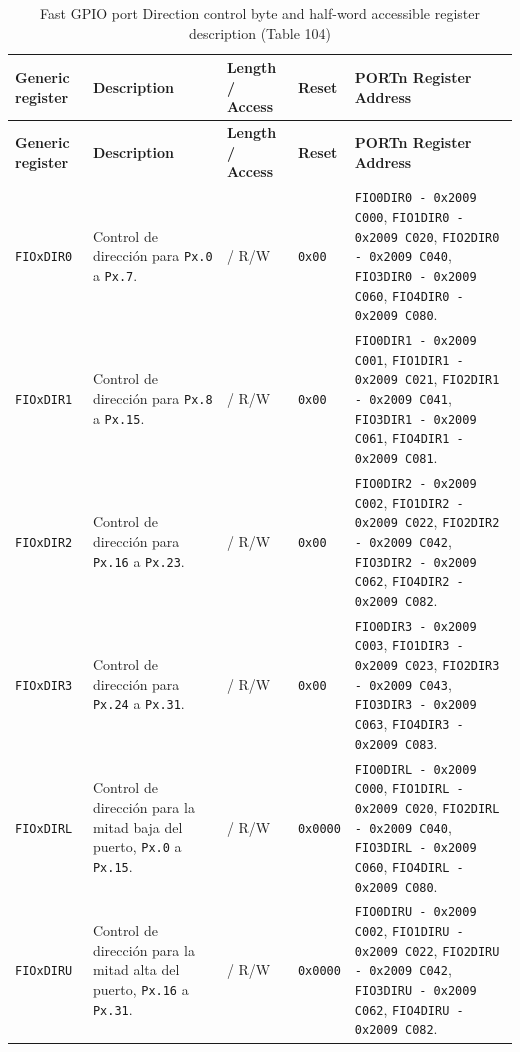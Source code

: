 \begin{longtable}{|>{\raggedright\arraybackslash}p{}|>{\raggedright\arraybackslash}p{}|>{\centering\arraybackslash}p{}|>{\centering\arraybackslash}p{}|>{\raggedright\arraybackslash}p{}|}
\caption{Fast GPIO port Direction control byte and half-word accessible register description (Table 104)} \\
\hline
\textbf{Generic register} & \textbf{Description} & \textbf{Length / Access} & \textbf{Reset} & \textbf{PORTn Register Address} \\
\hline
\endfirsthead
\hline
\textbf{Generic register} & \textbf{Description} & \textbf{Length / Access} & \textbf{Reset} & \textbf{PORTn Register Address} \\
\hline
\endhead
\texttt{FIOxDIR0} & Control de dirección para \texttt{Px.0} a \texttt{Px.7}. & 8 / R/W & \texttt{0x00} & \texttt{FIO0DIR0 - 0x2009 C000}, \texttt{FIO1DIR0 - 0x2009 C020}, \texttt{FIO2DIR0 - 0x2009 C040}, \texttt{FIO3DIR0 - 0x2009 C060}, \texttt{FIO4DIR0 - 0x2009 C080}. \\
\hline
\texttt{FIOxDIR1} & Control de dirección para \texttt{Px.8} a \texttt{Px.15}. & 8 / R/W & \texttt{0x00} & \texttt{FIO0DIR1 - 0x2009 C001}, \texttt{FIO1DIR1 - 0x2009 C021}, \texttt{FIO2DIR1 - 0x2009 C041}, \texttt{FIO3DIR1 - 0x2009 C061}, \texttt{FIO4DIR1 - 0x2009 C081}. \\
\hline
\texttt{FIOxDIR2} & Control de dirección para \texttt{Px.16} a \texttt{Px.23}. & 8 / R/W & \texttt{0x00} & \texttt{FIO0DIR2 - 0x2009 C002}, \texttt{FIO1DIR2 - 0x2009 C022}, \texttt{FIO2DIR2 - 0x2009 C042}, \texttt{FIO3DIR2 - 0x2009 C062}, \texttt{FIO4DIR2 - 0x2009 C082}. \\
\hline
\texttt{FIOxDIR3} & Control de dirección para \texttt{Px.24} a \texttt{Px.31}. & 8 / R/W & \texttt{0x00} & \texttt{FIO0DIR3 - 0x2009 C003}, \texttt{FIO1DIR3 - 0x2009 C023}, \texttt{FIO2DIR3 - 0x2009 C043}, \texttt{FIO3DIR3 - 0x2009 C063}, \texttt{FIO4DIR3 - 0x2009 C083}. \\
\hline
\texttt{FIOxDIRL} & Control de dirección para la mitad baja del puerto, \texttt{Px.0} a \texttt{Px.15}. & 16 / R/W & \texttt{0x0000} & \texttt{FIO0DIRL - 0x2009 C000}, \texttt{FIO1DIRL - 0x2009 C020}, \texttt{FIO2DIRL - 0x2009 C040}, \texttt{FIO3DIRL - 0x2009 C060}, \texttt{FIO4DIRL - 0x2009 C080}. \\
\hline
\texttt{FIOxDIRU} & Control de dirección para la mitad alta del puerto, \texttt{Px.16} a \texttt{Px.31}. & 16 / R/W & \texttt{0x0000} & \texttt{FIO0DIRU - 0x2009 C002}, \texttt{FIO1DIRU - 0x2009 C022}, \texttt{FIO2DIRU - 0x2009 C042}, \texttt{FIO3DIRU - 0x2009 C062}, \texttt{FIO4DIRU - 0x2009 C082}. \\
\hline
\end{longtable}

